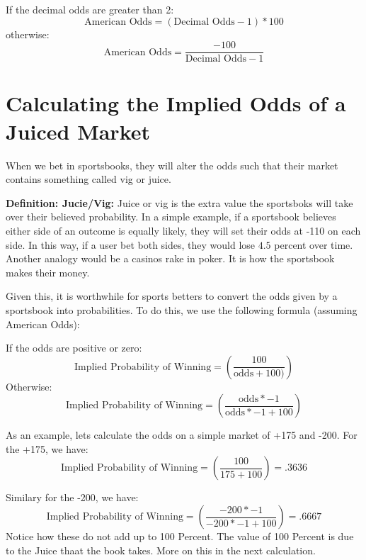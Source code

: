 \documentclass{article}
\begin{document}
If the decimal odds are greater than 2:
\begin{equation}
  \textrm{American Odds} = (\textrm{Decimal Odds}-1)*100
\end{equation}
otherwise:
\begin{equation}
  \textrm{American Odds} = \frac{-100}{\textrm{Decimal Odds}-1}
\end{equation}

\section{Calculating the Implied Odds of a Juiced Market}
When we bet in sportsbooks, they will alter the odds such that their market contains something called vig or juice. 

\textbf{Definition: Jucie/Vig:} Juice or vig is the extra value the sportsboks will take over their believed probability. In a simple example, if a sportsbook believes either side of an outcome is equally likely, they will set their odds at -110 on each side. In this way, if a user bet both sides, they would lose $4.5$ percent over time. Another analogy would be a casinos rake in poker. It is how the sportsbook makes their money.

Given this, it is worthwhile for sports betters to convert the odds given by a sportsbook into probabilities. To do this, we use the following formula (assuming American Odds):

If the odds are positive or zero:
\begin{equation}
  \textrm{Implied Probability of Winning} = \left(\frac{100}{\textrm{odds}+100)}\right)
\end{equation}
Otherwise:
\begin{equation}
  \textrm{Implied Probability of Winning} = \left(\frac{\textrm{odds}*-1}{\textrm{odds}*-1 + 100}\right)
\end{equation}

As an example, lets calculate the odds on a simple market of +175 and -200. For the +175, we have:
\begin{equation}
  \textrm{Implied Probability of Winning} = \left(\frac{100}{175+100}\right) = .3636 
\end{equation}

Similary for the -200, we have:
\begin{equation}
  \textrm{Implied Probability of Winning} = \left(\frac{-200*-1}{-200*-1+100}\right) = .6667 
\end{equation}
Notice how these do not add up to 100 Percent. The value of 100 Percent is due to the Juice thaat the book takes. More on this in the next calculation.
\end{document}
